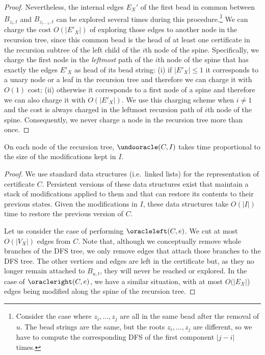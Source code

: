 \begin{proof}
	Nevertheless, the internal edges $E_X'$ of the first bead in
	common between $B_{z_i,t}$ and $B_{z_{i-1},t}$ can be explored
	several times during this procedure.\footnote{Consider the
	case where $z_i, \ldots, z_j$ are all in the same bead after
	the removal of $u$. The bead strings are the same, but the
	roots $z_i, \ldots, z_j$ are different, so we have to compute
	the corresponding DFS of the first component $|j-i|$ times.}
	We can charge the cost $O(|E'_X|)$ of exploring those edges to
	another node in the recursion tree, since this common bead is
	the head of at least one certificate in the recursion subtree
	of the left child of the $i$th node of the spine.
	Specifically, we charge the first node in the \emph{leftmost}
	path of the $i$th node of the spine that has exactly the
	edges $E'_X$ as head of its bead string: (i) if $|E'_X| \le 1$
	it corresponds to a unary node or a leaf in the recursion tree
	and therefore we can charge it with $O(1)$ cost; (ii)
	otherwise it corresponds to a first node of a spine and
	therefore we can also charge it with $O(|E'_X|)$. We use this
	charging scheme when $i \neq 1$ and the cost is always charged
	in the leftmost recursion path of $i$th node of the spine.
	Consequently, we never charge a node in the recursion tree more
	than once.  
\end{proof}

\begin{lemma}
	\label{lem:restore} On each node of the recursion tree,
	$\undooracle(C,I)$ takes time proportional to the size of the
	modifications kept in $I$.
\end{lemma}
\begin{proof}
	We use standard data structures (i.e.~linked lists) for the
        representation of certificate $C$.  Persistent versions of
        these data structures exist that maintain a stack of
        modifications applied to them and that can restore its
        contents to their previous states.  Given the modifications in
        $I$, these data structures take $O(|I|)$ time to restore the
        previous version of $C$.

        Let us consider the case of performing $\oracleleft(C,e)$. We
        cut at most $O(|V_X|)$ edges from $C$. Note that, although we
        conceptually remove whole branches of the DFS tree, we only
        remove edges that attach those branches to the DFS tree. The
        other vertices and edges are left in the certificate but, as
        they no longer remain attached to $B_{u,t}$, they will never
        be reached or explored. In the case of $\oracleright(C,e)$, we
        have a similar situation, with at most $O(|E_X|$) edges being
        modified along the spine of the recursion tree. 
\end{proof}


